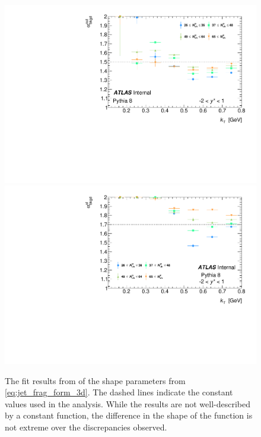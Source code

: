 \begin{figure}[t]
\centering
\includegraphics[width=.49\linewidth]{canqosl_backAlphaOut_vs_kt.pdf}
\includegraphics[width=.49\linewidth]{canqosl_backAlpha_vs_kt.pdf}\\
\caption{The fit results from  of the shape parameters from \cref{eq:jet_frag_form_3d}. The dashed lines indicate the constant values used in the analysis. While the results are not well-described by a constant function, the difference in the shape of the function is not extreme over the discrepancies observed.}
\label{fig:pythia_bkgd_alpha}
\end{figure}


